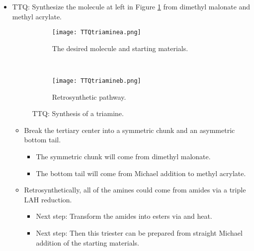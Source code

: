 \documentclass[../notes.tex]{subfiles}
\begin{document}
\begin{itemize}
\begin{itemize}
    \end{itemize}
    \pagebreak
    \item TTQ: Synthesize the molecule at left in Figure \ref{fig:TTQtriaminea} from dimethyl malonate and methyl acrylate.
    \begin{figure}[h!]
        \centering
        \begin{subfigure}[b]{\linewidth}
            \centering
            \texttt{[image: TTQtriaminea.png]}
            \caption{The desired molecule and starting materials.}
            \label{fig:TTQtriaminea}
        \end{subfigure}\\[2em]
        \begin{subfigure}[b]{\linewidth}
            \centering
            \texttt{[image: TTQtriamineb.png]}
            \caption{Retrosynthetic pathway.}
            \label{fig:TTQtriamineb}
        \end{subfigure}
        \caption{TTQ: Synthesis of a triamine.}
        \label{fig:TTQtriamine}
    \end{figure}
    \begin{itemize}
        \item Break the tertiary center into a symmetric chunk and an asymmetric bottom tail.
        \begin{itemize}
            \item The symmetric chunk will come from dimethyl malonate.
            \item The bottom tail will come from Michael addition to methyl acrylate.
        \end{itemize}
        \item Retrosynthetically, all of the amines could come from amides via a triple LAH reduction.
        \begin{itemize}
            \item Next step: Transform the amides into esters via  and heat.
            \item Next step: Then this triester can be prepared from straight Michael addition of the starting materials.
        \end{itemize}
    \end{itemize}
            

\end{itemize}
\end{document}
